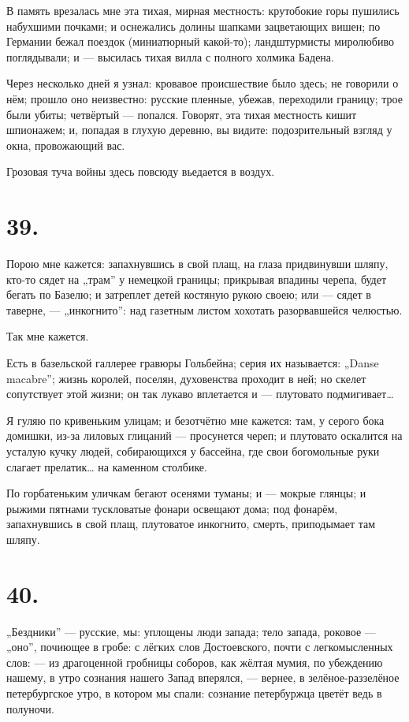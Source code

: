 \documentclass[12pt,a4paper,oneside]{book}
\begin{document}
В память врезалась мне эта тихая, мирная местность: крутобокие горы пушились набухшими почками; и оснежались долины шапками зацветающих вишен; по Германии бежал поездок (миниатюрный какой-то); ландштурмисты миролюбиво поглядывали; и — высилась тихая вилла с полного холмика Бадена.

Через несколько дней я узнал: кровавое происшествие было здесь; не говорили о нём; прошло оно неизвестно: русские пленные, убежав, переходили границу; трое были убиты; четвёртый — попался. Говорят, эта тихая местность кишит шпионажем; и, попадая в глухую деревню, вы видите: подозрительный взгляд у окна, провожающий вас.

Грозовая туча войны здесь повсюду вьедается в воздух.

\section*{39.}

Порою мне кажется: запахнувшись в свой плащ, на глаза придвинувши шляпу, кто-то сядет на „трам” у немецкой границы; прикрывая впадины черепа, будет бегать по Базелю; и затреплет детей костяную рукою своею; или — сядет в таверне, — „инкогнито”: над газетным листом хохотать разорвавшейся челюстью.

Так мне кажется.

Есть в базельской галлерее гравюры Гольбейна; серия их называется: „Danse macabre”; жизнь королей, поселян, духовенства проходит в ней; но скелет сопутствует этой жизни; он так лукаво вплетается и — плутовато подмигивает…

Я гуляю по кривеньким улицам; и безотчётно мне кажется: там, у серого бока домишки, из-за лиловых глицаний — просунется череп; и плутовато оскалится на усталую кучку людей, собирающихся у бассейна, где свои богомольные руки слагает прелатик… на каменном столбике.

По горбатеньким уличкам бегают осенями туманы; и — мокрые глянцы; и рыжими пятнами тускловатые фонари освещают дома; под фонарём, запахнувшись в свой плащ, плутоватое инкогнито, смерть, приподымает там шляпу.

\section*{40.}

„Бездники” — русские, мы: уплощены люди запада; тело запада, роковое — „оно”, почиющее в гробе: с лёгких слов Достоевского, почти с легкомысленных слов: — из драгоценной гробницы соборов, как жёлтая мумия, по убеждению нашему, в утро сознания нашего Запад вперялся, — вернее, в зелёное-раззелёное петербургское утро, в котором мы спали: сознание петербуржца цветёт ведь в полуночи.
\end{document}
